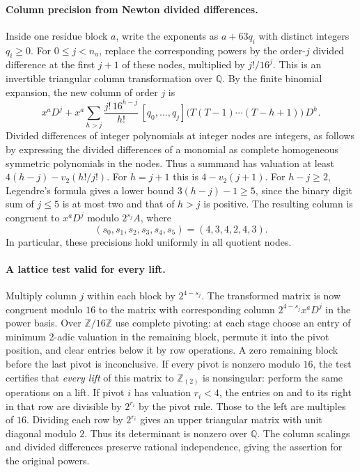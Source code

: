 \documentclass[11pt]{article}
\newcommand{\Z}{\mathbb Z}
\newcommand{\Q}{\mathbb Q}
\begin{document}
\paragraph{Column precision from Newton divided differences.}
Inside one residue block $a$, write the exponents as $a+63q_i$
with distinct integers $q_i\ge0$. For $0\le j<n_a$, replace the
corresponding powers by the order-$j$ divided difference at the first
$j+1$ of these nodes, multiplied by $j!/16^j$. This is an invertible
triangular column transformation over $\Q$. By the finite binomial
expansion, the new column of order $j$ is
\[
 x^a D^j+
 x^a\sum_{h>j} \frac{j!\,16^{h-j}}{h!}\,
        [q_0,\ldots,q_j]\bigl(T(T-1)\cdots(T-h+1)\bigr)\,D^h .
\]
Divided differences of integer polynomials at integer nodes are
integers, as follows by expressing the divided differences of a monomial
as complete homogeneous symmetric polynomials in the nodes.
Thus a summand has valuation at least $4(h-j)-v_2(h!/j!)$.
For $h=j+1$ this is $4-v_2(j+1)$. For $h-j\ge2$, Legendre's
formula gives a lower bound $3(h-j)-1\ge5$, since the binary digit
sum of $j\le5$ is at most two and that of $h>j$ is positive.
The resulting column is congruent to $x^aD^j$ modulo $2^{s_j}A$,
where
\[
             (s_0,s_1,s_2,s_3,s_4,s_5)=(4,3,4,2,4,3).
\]
In particular, these precisions hold uniformly in all quotient nodes.

\paragraph{A lattice test valid for every lift.}
Multiply column $j$ within each block by $2^{4-s_j}$. The transformed
matrix is now congruent modulo $16$ to the matrix with corresponding
column $2^{4-s_j} x^aD^j$ in the power basis. Over $\Z/16\Z$ use
complete pivoting: at each stage choose an entry of minimum
2-adic valuation in the remaining block, permute it into the pivot
position, and clear entries below it by row operations.
A zero remaining block before the last pivot is inconclusive.
If every pivot is nonzero modulo $16$, the test certifies
that \emph{every lift} of this matrix to $\Z_{(2)}$ is nonsingular:
perform the same operations on a lift. If pivot $i$ has valuation
$r_i<4$, the entries on and to its right in that row are divisible
by $2^{r_i}$ by the pivot rule. Those to the left are multiples of
$16$. Dividing each row by $2^{r_i}$ gives an upper triangular
matrix with unit diagonal modulo $2$. Thus its determinant is
nonzero over $\Q$. The column scalings and divided differences
preserve rational independence, giving the assertion for the
original powers.
\end{document}
